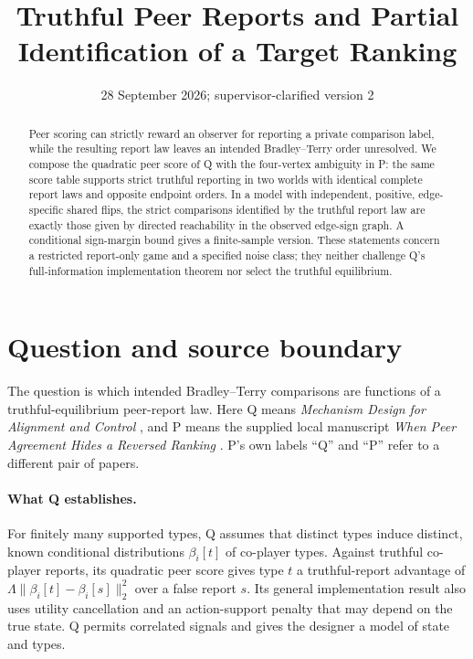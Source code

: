 \documentclass{article}
\title{Truthful Peer Reports and Partial Identification of a Target Ranking}
\date{28 September 2026; supervisor-clarified version 2}
\begin{document}
\maketitle

\begin{abstract}
Peer scoring can strictly reward an observer for reporting a private comparison label, while the
resulting report law leaves an intended Bradley--Terry order unresolved. We compose the quadratic peer
score of Q with the four-vertex ambiguity in P: the same score table supports strict truthful reporting
in two worlds with identical complete report laws and opposite endpoint orders. In a model with
independent, positive, edge-specific shared flips, the strict comparisons identified by the truthful
report law are exactly those given by directed reachability in the observed edge-sign graph. A
conditional sign-margin bound gives a finite-sample version. These statements concern a restricted
report-only game and a specified noise class; they neither challenge Q's full-information implementation
theorem nor select the truthful equilibrium. %
\end{abstract}

\section{Question and source boundary}

The question is which intended Bradley--Terry comparisons are functions of a truthful-equilibrium
peer-report law. Here Q means \emph{Mechanism Design for Alignment and Control} \cite{Q}, and P means the
supplied local manuscript \emph{When Peer Agreement Hides a Reversed Ranking} \cite{P}. P's own labels
``Q'' and ``P'' refer to a different pair of papers. %

\paragraph{What Q establishes.}
For finitely many supported types, Q assumes that distinct types induce distinct, known conditional
distributions \(\beta_i[t]\) of co-player types. Against truthful co-player reports, its quadratic peer
score gives type \(t\) a truthful-report advantage of \(\Lambda\|\beta_i[t]-\beta_i[s]\|_2^2\) over a
false report \(s\). Its general implementation result also uses utility cancellation and an
action-support penalty that may depend on the true state. Q permits correlated signals and gives the
designer a model of state and types. %
\end{document}
